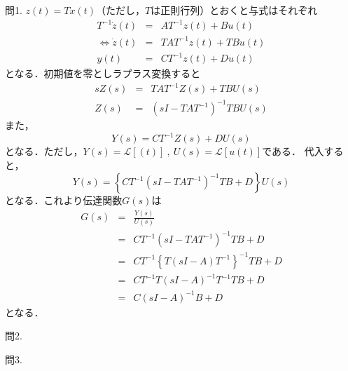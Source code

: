 \documentclass[a4paper,12pt]{jarticle}
\begin{document}
\section*{}
問1.
$z(t)=Tx(t)$（ただし，$T$は正則行列）とおくと与式はそれぞれ
\begin{eqnarray}
 T^{-1}\dot{z}(t)&=&AT^{-1} z(t)+Bu(t) \nonumber\\
 \iff \dot{z}(t)&=&TAT^{-1}z(t)+TBu(t)\\
 y(t)&=&CT^{-1}z(t)+Du(t)
\end{eqnarray}
となる．初期値を零としラプラス変換すると
\begin{eqnarray}
 sZ(s)&=&TAT^{-1}Z(s)+TBU(s) \nonumber\\
 Z(s)&=&(sI-TAT^{-1})^{-1}TBU(s)
\end{eqnarray}
また，
\begin{equation}
 Y(s)=CT^{-1}Z(s)+DU(s)
\end{equation}
となる．ただし，$Y(s)=\mathcal{L}[(t)]~,~U(s)=\mathcal{L}[u(t)]$である．
代入すると，
%
\begin{equation}
 Y(s)=\left\{CT^{-1}(sI-TAT^{-1})^{-1}TB+D\right\}U(s)
\end{equation}
%
となる．これより伝達関数$G(s)$は
%
\begin{eqnarray}
 G(s)&=&\frac{Y(s)}{U(s)} \nonumber\\
 &=&CT^{-1}(sI-TAT^{-1})^{-1}TB+D \nonumber\\
 &=&CT^{-1}\left\{T(sI-A)T^{-1}\right\}^{-1}TB+D \nonumber\\
 &=&CT^{-1}T(sI-A)^{-1}T^{-1}TB+D \nonumber\\
 &=&C(sI-A)^{-1}B+D
\end{eqnarray}
%
となる．

問2.


問3.
\end{document}
